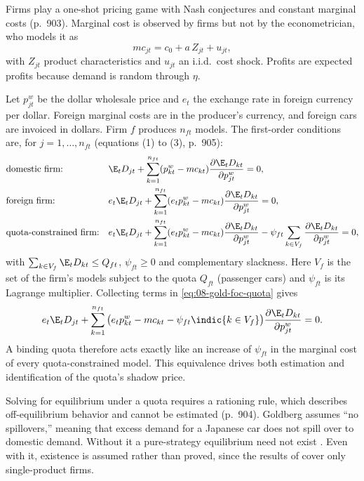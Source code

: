  Firms play a one-shot pricing game with Nash conjectures and constant marginal costs (p.~903).
Marginal cost is observed by firms but not by the econometrician, who models it as
\begin{equation}\label{eq:08-gold-cost}
mc_{jt} = c_0 + a\, Z_{jt} + u_{jt},
\end{equation}
with $Z_{jt}$ product characteristics and $u_{jt}$ an i.i.d.\ cost shock. Profits are expected profits because
demand is random through $\eta$.

 Let $p^w_{jt}$ be the dollar wholesale price and $e_t$ the exchange rate in
foreign currency per dollar. Foreign marginal costs are in the producer's currency, and foreign cars are invoiced
in dollars. Firm $f$ produces $n_{ft}$ models. The first-order conditions are, for $j = 1,\dots,n_{ft}$
(equations (1) to (3), p.~905):
\begin{align}
&\text{domestic firm:} &&
\E_t D_{jt} + \sum_{k=1}^{n_{ft}}(p^w_{kt} - mc_{kt})\frac{\partial \E_t D_{kt}}{\partial p^w_{jt}} = 0,
\label{eq:08-gold-foc-dom}\\
&\text{foreign firm:} &&
e_t \E_t D_{jt} + \sum_{k=1}^{n_{ft}}(e_t p^w_{kt} - mc_{kt})\frac{\partial \E_t D_{kt}}{\partial p^w_{jt}} = 0,
\label{eq:08-gold-foc-for}\\
&\text{quota-constrained firm:} &&
e_t \E_t D_{jt} + \sum_{k=1}^{n_{ft}}(e_t p^w_{kt} - mc_{kt})\frac{\partial \E_t D_{kt}}{\partial p^w_{jt}}
- \psi_{ft}\sum_{k \in V_f}\frac{\partial \E_t D_{kt}}{\partial p^w_{jt}} = 0, \label{eq:08-gold-foc-quota}
\end{align}
with $\sum_{k\in V_f}\E_t D_{kt} \leq Q_{ft}$, $\psi_{ft}\geq 0$ and complementary slackness. Here $V_f$ is the
set of the firm's models subject to the quota $Q_{ft}$ (passenger cars) and $\psi_{ft}$ is its Lagrange
multiplier. Collecting terms in \cref{eq:08-gold-foc-quota} gives
\[
e_t \E_t D_{jt} + \sum_{k=1}^{n_{ft}}\big(e_t p^w_{kt} - mc_{kt} - \psi_{ft}\indic\{k\in V_f\}\big)
\frac{\partial \E_t D_{kt}}{\partial p^w_{jt}} = 0 .
\]
A binding quota therefore acts exactly like an increase of $\psi_{ft}$ in the marginal cost of every
quota-constrained model. This equivalence drives both estimation and identification of the quota's shadow
price.

Solving for equilibrium under a quota requires a rationing rule, which describes off-equilibrium behavior and
cannot be estimated (p.~904). Goldberg assumes ``no spillovers,'' meaning that excess demand for a Japanese car
does not spill over to domestic demand. Without it a pure-strategy equilibrium need not exist \citep{Krishna1989}. Even
with it, existence is assumed rather than proved, since the results of \citet{CaplinNalebuff1991} cover only
single-product firms.

